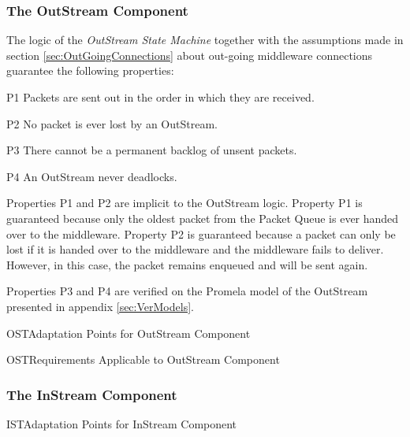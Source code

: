 \documentclass[a4paper,10pt]{article}
\newenvironment{fw_itemize}						%
{\begin{itemize}
  \setlength{\itemsep}{1mm}
  \setlength{\parskip}{0pt}
  \setlength{\parsep}{0pt}}
{\end{itemize}}
\newenvironment{cr_req}[2]
{%
\begin{longtable}{|l|p{9.8cm}|}
\caption{#2} \\
\hline
\rowcolor{light-gray}
\textbf{Req. ID} & \textbf{Requirement Text}\\
\hline\hline
\endfirsthead
\rowcolor{light-gray}
\textbf{Req. ID} & \textbf{Requirement Text}\\
\hline\hline
\endhead
\DTLforeach*[\DTLiseq{\cat}{#1}]{dbReq}{\cat=Category,\type=Type,\id=Id,\reqText=Text}
{\DTLiffirstrow{}{\\\hline}\cat-\id/\type & \textit{\reqText}}\\\hline
}
{\end{longtable}}
\newenvironment{cr_ap}[2]
{%
\begin{longtable}{|l|p{4.7cm}|p{4.9cm}|}
\caption{#2} \\
\hline
\rowcolor{light-gray}
\textbf{AP ID} & \textbf{Adaptation Point} & \textbf{Default Value}\\
\hline\hline
\endfirsthead
\rowcolor{light-gray}
\textbf{AP ID} & \textbf{Adaptation Point} & \textbf{Default Value}\\
\hline\hline
\endhead
\DTLforeach*[\DTLiseq{\cat}{#1}]{dbAP}{\cat=Category,\id=Id,\ap=AP,\defValue=DefValue}
{\DTLiffirstrow{}{\\\hline}\cat-\id & \ap & \defValue}\\\hline
}
{\end{longtable}}
\begin{document}
\subsubsection{The OutStream Component}\label{sec:OutStream}


The logic of the \textit{OutStream State Machine} together with the assumptions made in section \ref{sec:OutGoingConnections} about out-going middleware connections guarantee the following properties:

\begin{fw_itemize}
\item[P1]{Packets are sent out in the order in which they are received.}
\item[P2]{No packet is ever lost by an OutStream.}
\item[P3]{There cannot be a permanent backlog of unsent packets.}
\item[P4]{An OutStream never deadlocks.}
\end{fw_itemize}

Properties P1 and P2 are implicit to the OutStream logic. Property P1 is guaranteed because only the oldest packet from the Packet Queue is ever handed over to the middleware. Property P2 is guaranteed because a packet can only be lost if it is handed over to the middleware and the middleware fails to deliver. However, in this case, the packet remains enqueued and will be sent again.

Properties P3 and P4 are verified on the Promela model of the OutStream presented in appendix \ref{sec:VerModels}. 

\begin{cr_ap}{OST}{Adaptation Points for OutStream Component}
\end{cr_ap}

\begin{cr_req}{OST}{Requirements Applicable to OutStream Component}
\end{cr_req}

\subsubsection{The InStream Component}\label{sec:InStream}


\begin{cr_ap}{IST}{Adaptation Points for InStream Component}
\end{cr_ap}
\end{document}
